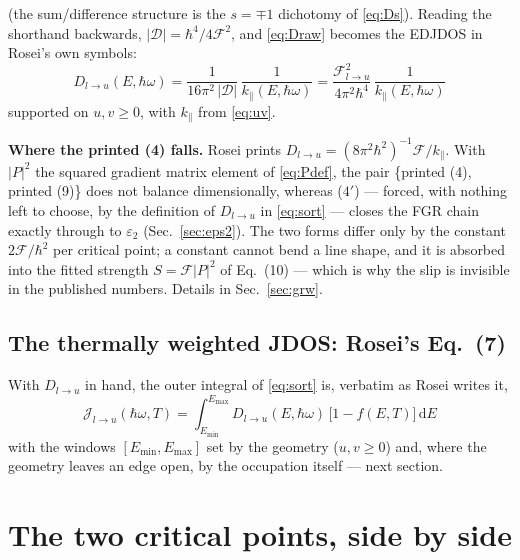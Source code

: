 \documentclass[11pt,a4paper]{article}
\numberwithin{equation}{section}
\begin{document}
(the sum/difference structure is the $s=\mp1$ dichotomy of
\eqref{eq:Ds}).  Reading the shorthand backwards,
$|{\mathcal{D}}|=\hbar^4/4{\mathcal{F}}^2$, and \eqref{eq:Draw} becomes the EDJDOS in
Rosei's own symbols:
\begin{equation}
\boxed{\;
{D_{l\to u}}(E,{\hbar\omega})=\frac{1}{16\pi^2\,|{\mathcal{D}}|}\,\frac{1}{{k_{\parallel}}(E,{\hbar\omega})}
=\frac{{\mathcal{F}}_{l\to u}^{2}}{4\pi^2\hbar^{4}}\,\frac{1}{{k_{\parallel}}(E,{\hbar\omega})}
\;}
\tag{4$'$}
\label{eq:D4p}
\end{equation}
supported on $u,v\ge0$, with ${k_{\parallel}}$ from \eqref{eq:uv}.

\medskip
\noindent\textbf{Where the printed (4) falls.}  Rosei prints
${D_{l\to u}}=(8\pi^2\hbar^2)^{-1}{\mathcal{F}}/{k_{\parallel}}$.  With $|P|^2$ the squared
gradient matrix element of \eqref{eq:Pdef}, the pair \{printed (4),
printed (9)\} does not balance dimensionally, whereas ($4'$) ---
forced, with nothing left to choose, by the definition of ${D_{l\to u}}$ in
\eqref{eq:sort} --- closes the FGR chain exactly through to ${\varepsilon}_2$
(Sec.~\ref{sec:eps2}).  The two forms differ only by the constant
$2{\mathcal{F}}/\hbar^2$ per critical point; a constant cannot bend a line
shape, and it is absorbed into the fitted strength $S={\mathcal{F}}|P|^2$ of
Eq.~(10) --- which is why the slip is invisible in the published
numbers.  Details in Sec.~\ref{sec:grw}.

\subsection{The thermally weighted JDOS: Rosei's Eq.\ (7)}

With ${D_{l\to u}}$ in hand, the outer integral of \eqref{eq:sort} is,
verbatim as Rosei writes it,
\begin{equation}
\boxed{\;
{\mathcal{J}}_{l\to u}({\hbar\omega},T)=\int_{E_{\min}}^{E_{\max}}
{D_{l\to u}}(E,{\hbar\omega})\,\bigl[1-{f}(E,T)\bigr]\,{\mathrm{d}} E
\;}
\tag{7}
\label{eq:J7}
\end{equation}
with the windows $[E_{\min},E_{\max}]$ set by the geometry
($u,v\ge0$) and, where the geometry leaves an edge open, by the
occupation itself --- next section.

\section{The two critical points, side by side}\label{sec:XL}
\end{document}
